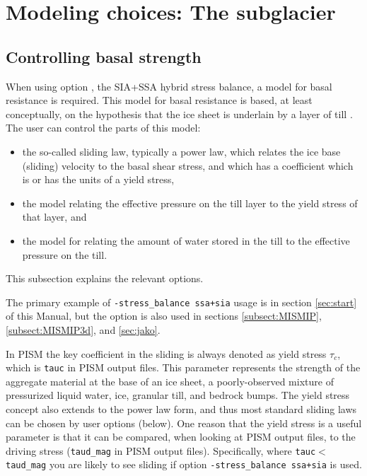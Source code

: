 \section{Modeling choices:  The subglacier}
\label{sec:modeling-subglacier}

\subsection{Controlling basal strength}  \label{subsect:basestrength}

When using option , the SIA+SSA hybrid stress balance, a model for basal resistance is required.  This model for basal resistance is based, at least conceptually, on the hypothesis that the ice sheet is underlain by a layer of till \cite{Clarke05}.  The user can control the parts of this model:\begin{itemize}
\item the so-called sliding law, typically a power law, which relates the ice base (sliding) velocity to the basal shear stress, and which has a coefficient which is or has the units of a yield stress,
\item the model relating the effective pressure on the till layer to the yield stress of that layer, and
\item the model for relating the amount of water stored in the till to the effective pressure on the till.
\end{itemize}
This subsection explains the relevant options.

The primary example of \texttt{-stress_balance ssa+sia} usage is in section \ref{sec:start} of this Manual, but the option is also used in sections \ref{subsect:MISMIP}, \ref{subsect:MISMIP3d}, and \ref{sec:jako}.

In PISM the key coefficient in the sliding is always denoted as yield stress $\tau_c$, which is \texttt{tauc} in PISM output files.  This parameter represents the strength of the aggregate material at the base of an ice sheet, a poorly-observed mixture of pressurized liquid water, ice, granular till, and bedrock bumps.  The yield stress concept also extends to the power law form, and thus most standard sliding laws can be chosen by user options (below).  One reason that the yield stress is a useful parameter is that it can be compared, when looking at PISM output files, to the driving stress (\texttt{taud_mag} in PISM output files).  Specifically, where \texttt{tauc}$<$\texttt{taud_mag} you are likely to see sliding if option \texttt{-stress_balance ssa+sia} is used.

